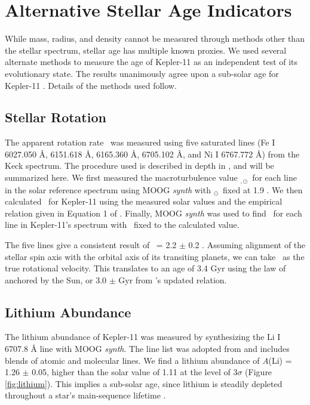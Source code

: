 \documentclass[oneside]{emulateapj}
\begin{document}
\section{Alternative Stellar Age Indicators}
\label{s:ages}

While mass, radius, and density cannot be measured through methods other than the stellar spectrum, stellar age has multiple known proxies. We used several alternate methods to measure the age of Kepler-11 as an independent test of its evolutionary state. The results unanimously agree upon a sub-solar age for Kepler-11 . Details of the methods used follow.

\subsection{Stellar Rotation}

The apparent rotation rate \vsini\ was measured using five saturated lines (Fe I 6027.050 \r{A}, 6151.618 \r{A}, 6165.360 \r{A}, 6705.102 \r{A}, and Ni I 6767.772 \r{A}) from the Keck spectrum. The procedure used is described in depth in \citet{dosSantos2016}, and will be summarized here. We first measured the macroturbulence value \vmacro$_{,\odot}$\ for each line in the solar reference spectrum using MOOG \textit{synth} with \vsini$_{\odot}$\ fixed at 1.9 \kms. We then calculated \vmacro\ for Kepler-11 using the measured solar values and the empirical relation given in Equation 1 of \citet{dosSantos2016}. Finally, MOOG \textit{synth} was used to find \vsini\ for each line in Kepler-11's spectrum with \vmacro\ fixed to the calculated value.

The five lines give a consistent result of \vsini\ = 2.2 $\pm$ 0.2 \kms. Assuming alignment of the stellar spin axis with the orbital axis of its transiting planets, we can take \vsini\ as the true rotational velocity.  This translates to an age of 3.4 Gyr using the law of \citet{Skumanich1972} anchored by the Sun, or 3.0 $\pm$  Gyr from \citet{dosSantos2016}'s updated relation.

\subsection{Lithium Abundance}
\label{s:lithium}

The lithium abundance of Kepler-11 was measured by synthesizing the Li I 6707.8 \r{A} line with MOOG \textit{synth}. The line list was adopted from \citet{Melendez2012} and includes blends of atomic and molecular lines. We find a lithium abundance of \textit{A}(Li) = 1.26 $\pm$ 0.05, higher than the solar value of 1.11 at the level of 3$\sigma$ (Figure \ref{fig:lithium}). This implies a sub-solar age, since lithium is steadily depleted throughout a star's main-sequence lifetime .
\end{document}
